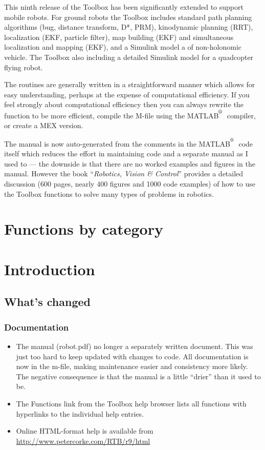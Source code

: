 \documentclass[a4paper]{report}
\def\Mlab{MATLAB$^{\textsuperscript{\textregistered}}$}
\begin{document}
This ninth release of the Toolbox has been significantly extended to support mobile robots.
For ground robots the Toolbox includes standard path planning algorithms (bug, distance transform, D*, PRM), kinodynamic planning (RRT),
localization (EKF, particle filter), map building (EKF) and simultaneous localization and mapping (EKF), and
a Simulink model a of non-holonomic vehicle.
The Toolbox also including a detailed Simulink model for a quadcopter flying robot.

The routines are generally written in a straightforward manner which allows
for easy understanding, perhaps at the expense of computational efficiency.
If you feel strongly about computational efficiency then you can always
rewrite the function to be more efficient,
compile the M-file using the \Mlab\   compiler, or
create a MEX version.

The manual is now auto-generated from the comments in the \Mlab\ code itself which reduces the effort
in maintaining code and a separate manual as I used to --- the downside is that there are no worked examples and figures in the manual.
However the book ``\textit{Robotics, Vision \& Control}''  provides a detailed discussion (600 pages, nearly 400 figures and 1000 code examples)
of how to use the Toolbox functions to
solve many types of problems in robotics.


\newpage
\tableofcontents
\newpage
\chapter*{Functions by category}
\begin{multicols}{2}

\end{multicols}
\newpage
\chapter{Introduction}
\section{What's changed}

\subsection{Documentation}
\begin{itemize}
\item The manual (robot.pdf) no longer a separately written document.  This was just too hard to keep updated with changes to code.
All documentation is now in the m-file, making maintenance easier and consistency more likely.
The negative consequence is that the manual is a little ``drier'' than it used to be.
\item The Functions link from the Toolbox help browser lists all functions with hyperlinks to the individual help entries.
\item Online HTML-format help is available from \url{http://www.petercorke.com/RTB/r9/html}
\end{itemize}
\end{document}
